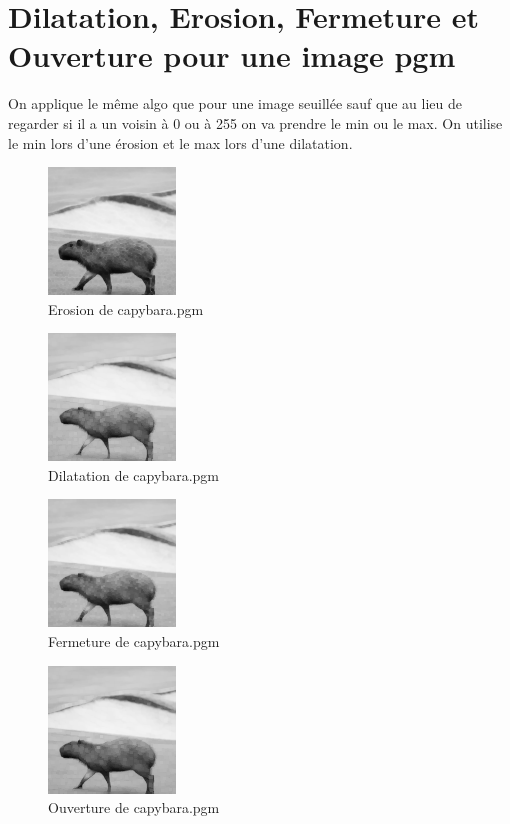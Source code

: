 \documentclass{article}
\begin{document}
\newpage
\section{Dilatation, Erosion, Fermeture et Ouverture pour une image pgm}

On applique le même algo que pour une image seuillée sauf que au lieu de regarder si il a un voisin à 0 ou à 255 on va prendre le min ou le max.
On utilise le min lors d'une érosion et le max lors d'une dilatation.

\begin{figure}[h]
\centerline{\includegraphics[scale=1.4]{./rendus/ErosionGrey.png}}
\caption{Erosion de capybara.pgm}
\end{figure}

\begin{figure}[h]
\centerline{\includegraphics[scale=1.4]{./rendus/DilatationGrey.png}}
\caption{Dilatation de capybara.pgm}
\end{figure}

\begin{figure}[h]
\centerline{\includegraphics[scale=1.4]{./rendus/FermetureGrey.png}}
\caption{Fermeture de capybara.pgm}
\end{figure}

\begin{figure}
\centerline{\includegraphics[scale=1.4]{./rendus/OuvertureGrey.png}}
\caption{Ouverture de capybara.pgm}
\end{figure}
\end{document}
